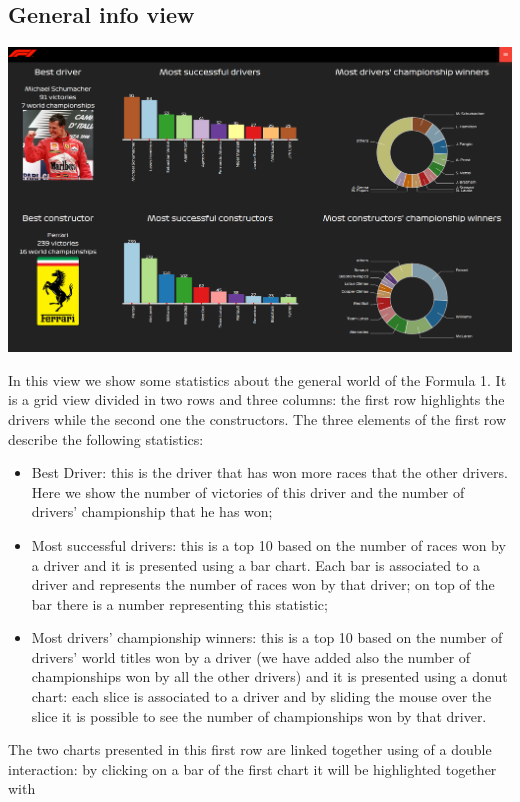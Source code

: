 \documentclass[10pt,twocolumn,letterpaper]{article}
\begin{document}
\subsection{General info view}
\begin{center}
	\centering
	\includegraphics[width=\columnwidth]{generalinfo}
\end{center}
In this view we show some statistics about the general world of the Formula 1. It is a grid view divided in two rows and three columns: the first row highlights the drivers
while the second one the constructors. The three elements of the first row describe the following statistics:
\begin{itemize}
	\item Best Driver: this is the driver that has won more races that the other drivers. Here we show the number of victories of this driver and the number of drivers'
	championship that he has won;
	\item Most successful drivers: this is a top 10 based on the number of races won by a driver and it is presented using a bar chart. Each bar is associated to a driver and
	represents the number of races won by that driver; on top of the bar there is a number representing this statistic;
	\item Most drivers' championship winners: this is a top 10 based on the number of drivers' world titles won by a driver (we have added also the number of championships
	won by all the other drivers) and it is presented using a donut chart: each slice is associated to a driver and by sliding the mouse over the slice it is possible to see the 
	number of championships won by that driver.
\end{itemize}
The two charts presented in this first row are linked together using of a double interaction: by clicking on a bar of the first chart it will be highlighted together with
\end{document}
